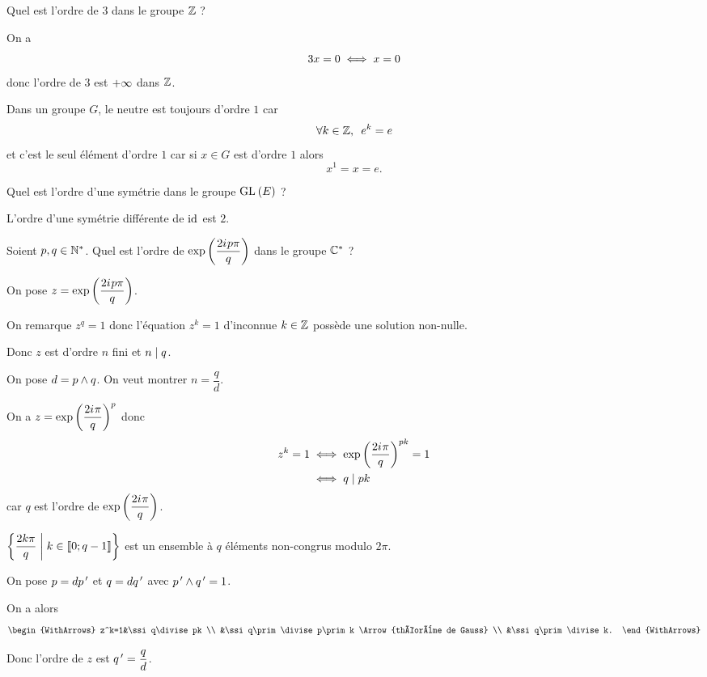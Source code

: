 \begin{exo}
Quel est l'ordre de \(3\) dans le groupe \(\mathbb{Z}\) ?
\end{exo}

\begin{corr}
On a \[3x=0\iff x=0\] donc l'ordre de \(3\) est \(+\infty\) dans \(\mathbb{Z}\).
\end{corr}

\begin{rem}
Dans un groupe \(G\), le neutre est toujours d'ordre \(1\) car \[\quantifs{\forall k\in\Z}e^k=e\] et c'est le seul élément d'ordre \(1\) car si \(x\in G\) est d'ordre \(1\) alors \[x^1=x=e.\]
\end{rem}

\begin{exo}
Quel est l'ordre d'une symétrie dans le groupe \(\GL{}[E]\) ?
\end{exo}

\begin{corr}
L'ordre d'une symétrie différente de \(\mathrm{id}_{}\) est \(2\).
\end{corr}

\begin{exo}
Soient \(p,q\in\mathbb{N}^*\). Quel est l'ordre de \(\exp\left(\dfrac{2i\mkern1mu p\pi}{q}\right)\) dans le groupe \(\mathbb{C}^*\) ?
\end{exo}

\begin{corr}
On pose \(z=\exp\left(\dfrac{2i\mkern1mu p\pi}{q}\right)\).

On remarque \(z^q=1\) donc l'équation \(z^k=1\) d'inconnue \(k\in\mathbb{Z}\) possède une solution non-nulle.

Donc \(z\) est d'ordre \(n\) fini et \(n\mid q\).

On pose \(d=p\land q\). On veut montrer \(n=\dfrac{q}{d}\).

On a \(z=\exp\left(\dfrac{2i\mkern1mu\pi}{q}\right)^p\) donc \[\begin{aligned}
z^k=1&\iff\exp\left(\dfrac{2i\mkern1mu\pi}{q}\right)^{pk}=1 \\
&\iff q\mid pk
\end{aligned}\] car \(q\) est l'ordre de \(\exp\left(\dfrac{2i\mkern1mu\pi}{q}\right)\).

\(\left\lbrace\dfrac{2k\pi}{q}\;\middle|\; k\in\left\llbracket0;q-1\right\rrbracket\right\rbrace\) est un ensemble à \(q\) éléments non-congrus modulo \(2\pi\).

On pose \(p=dp^{\,\prime}\) et \(q=dq^{\,\prime}\) avec \(p^{\,\prime}\land q^{\,\prime}=1\).

On a alors \[\begin{WithArrows}
z^k=1&\ssi q\divise pk \\
&\ssi q\prim\divise p\prim k \Arrow{théorème de Gauss} \\
&\ssi q\prim\divise k.
\end{WithArrows}\]

Donc l'ordre de \(z\) est \(q^{\,\prime}=\dfrac{q}{d}\).
\end{corr}


